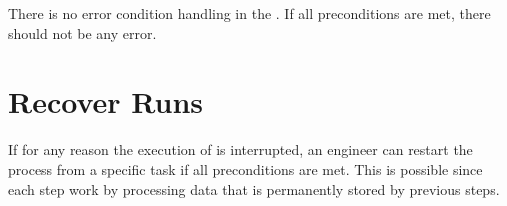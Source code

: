 
There is no error condition handling in the \FAQAS. If all preconditions are met, there should not be any error.

\section{Recover Runs}


If for any reason the execution of \DAMA is interrupted, an engineer can restart the process from a specific task if all preconditions are met. This is possible since each \DAMA step work by processing data that is permanently stored by previous steps.
